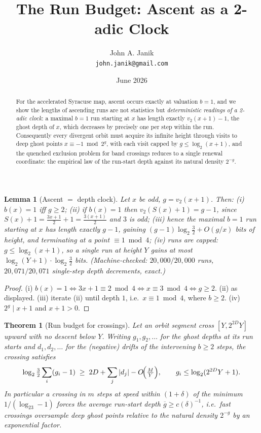 \documentclass[11pt]{article}
\title{The Run Budget: Ascent as a 2-adic Clock}
\author{John A. Janik\\ \small\texttt{john.janik@gmail.com}}
\date{June 2026}
\newtheorem{lemma}{Lemma}
\newtheorem{theorem}{Theorem}
\begin{document}
\maketitle

\begin{abstract}
For the accelerated Syracuse map, ascent occurs exactly at valuation
$b=1$, and we show the lengths of ascending runs are not statistics but
\emph{deterministic readings of a 2-adic clock}: a maximal $b{=}1$ run
starting at $x$ has length exactly $v_2(x+1)-1$, the ghost depth of $x$,
which decreases by precisely one per step within the run. Consequently
every divergent orbit must acquire its infinite height through visits to
deep ghost points $x\equiv-1\bmod2^{g}$, with each visit capped by
$g\le\log_2(x+1)$, and the quenched exclusion problem for band crossings
reduces to a single renewal coordinate: the empirical law of the run-start
depth against its natural density $2^{-g}$.
\end{abstract}

\begin{lemma}[Ascent $=$ depth clock]\label{lem:clock}
Let $x$ be odd, $g=v_2(x+1)$. Then:
\emph{(i)} $b(x)=1$ iff $g\ge2$;
\emph{(ii)} if $b(x)=1$ then $v_2(S(x)+1)=g-1$, since
$S(x)+1=\tfrac{3x+1}{2}+1=\tfrac{3(x+1)}{2}$ and $3$ is odd;
\emph{(iii)} hence the maximal $b{=}1$ run starting at $x$ has length
exactly $g-1$, gaining $(g-1)\log_2\tfrac32+O(g/x)$ bits of height, and
terminating at a point $\equiv1\bmod4$;
\emph{(iv)} runs are capped: $g\le\log_2(x+1)$, so a single run at height
$Y$ gains at most $\log_2(Y{+}1)\cdot\log_2\tfrac32$ bits.
(Machine-checked: $20{,}000/20{,}000$ runs, $20{,}071/20{,}071$
single-step depth decrements, exact.)
\end{lemma}

\begin{proof}
(i) $b(x)=1\iff3x+1\equiv2\bmod4\iff x\equiv3\bmod4\iff g\ge2$.
(ii) as displayed. (iii) iterate (ii) until depth $1$, i.e.\
$x\equiv1\bmod4$, where $b\ge2$. (iv) $2^{g}\mid x+1$ and $x+1>0$.
\end{proof}

\begin{theorem}[Run budget for crossings]\label{thm:budget}
Let an orbit segment cross $[Y,2^{2D}Y]$ upward with no descent below
$Y$. Writing $g_1,g_2,\dots$ for the ghost depths at its run starts and
$d_1,d_2,\dots$ for the (negative) drifts of the intervening $b\ge2$
steps, the crossing satisfies
\[
\log_2\tfrac32\sum_i(g_i-1)\;\ge\;2D+\sum_j|d_j|-O\!\Bigl(\tfrac{M}{Y}\Bigr),
\qquad g_i\le\log_2(2^{2D}Y+1).
\]
In particular a crossing in $m$ steps at speed within $(1+\delta)$ of the
minimum $1/(\log_23-1)$ forces the average run-start depth
$\overline g\ge c(\delta)^{-1}$, i.e.\ fast crossings oversample deep
ghost points relative to the natural density $2^{-g}$ by an exponential
factor.
\end{theorem}
\end{document}
